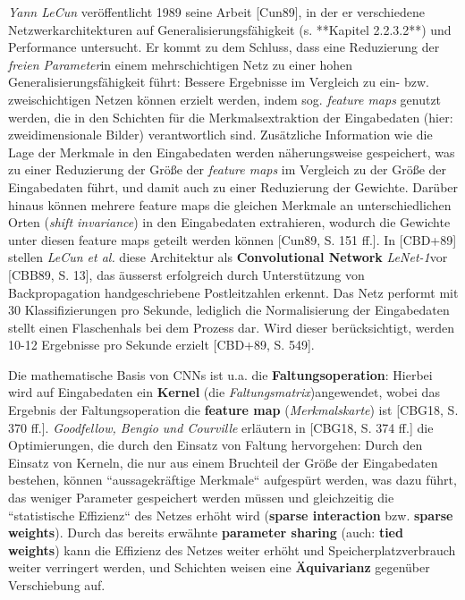 \textit{Yann LeCun} veröffentlicht 1989 seine Arbeit [Cun89], in der er verschiedene Netzwerkarchitekturen auf Generalisierungsfähigkeit (s. **Kapitel 2.2.3.2**) und Performance untersucht. Er kommt zu dem Schluss, dass eine Reduzierung der \textit{freien Parameter}\footnotemark[38] in einem mehrschichtigen Netz zu einer hohen Generalisierungsfähigkeit führt: Bessere Ergebnisse im Vergleich zu  ein- bzw. zweischichtigen Netzen können erzielt werden, indem sog. \textit{feature maps} genutzt werden, die in den Schichten für die Merkmalsextraktion der Eingabedaten (hier: zweidimensionale Bilder) verantwortlich sind. Zusätzliche Information wie die Lage der Merkmale in den Eingabedaten werden näherungsweise gespeichert, was zu einer Reduzierung der Größe der \textit{feature maps} im Vergleich zu der Größe der Eingabedaten führt, und damit auch zu einer Reduzierung der Gewichte. Darüber hinaus können mehrere feature maps die gleichen Merkmale an unterschiedlichen Orten (\textit{shift invariance}) in den Eingabedaten extrahieren, wodurch die Gewichte unter diesen feature maps geteilt werden können [Cun89, S. 151 ff.].
In [CBD+89] stellen \textit{LeCun et al.} diese Architektur als \textbf{Convolutional Network} \textit{LeNet-1}\footnotemark[39] vor [CBB89, S. 13], das äusserst erfolgreich durch Unterstützung von Backpropagation  handgeschriebene Postleitzahlen erkennt\footnotemark[40]. Das Netz performt mit 30 Klassifizierungen pro Sekunde, lediglich die Normalisierung der Eingabedaten stellt einen Flaschenhals bei dem Prozess dar. Wird dieser berücksichtigt, werden 10-12 Ergebnisse pro Sekunde erzielt [CBD+89, S. 549].

Die mathematische Basis von CNNs ist u.a. die \textbf{Faltungsoperation}\footnotemark[41]: Hierbei wird auf Eingabedaten ein \textbf{Kernel} (die \textit{Faltungsmatrix})\footnotemark[42] angewendet, wobei das Ergebnis der Faltungsoperation die \textbf{feature map} (\textit{Merkmalskarte}) ist [CBG18, S. 370 ff.]. \textit{Goodfellow, Bengio und Courville} erläutern in [CBG18, S. 374 ff.] die Optimierungen, die durch den Einsatz von Faltung hervorgehen: Durch den Einsatz von Kerneln, die nur aus einem Bruchteil der Größe der Eingabedaten bestehen\footnotemark[43], können ``aussagekräftige Merkmale`` aufgespürt werden, was dazu führt, das weniger Parameter gespeichert werden müssen und gleichzeitig die ``statistische Effizienz`` des Netzes erhöht wird (\textbf{sparse interaction} bzw. \textbf{sparse weights}). Durch das bereits erwähnte \textbf{parameter sharing} (auch: \textbf{tied weights}) kann die Effizienz des Netzes weiter erhöht und Speicherplatzverbrauch weiter verringert werden, und Schichten weisen eine \textbf{Äquivarianz} gegenüber Verschiebung auf\footnotemark[44].


